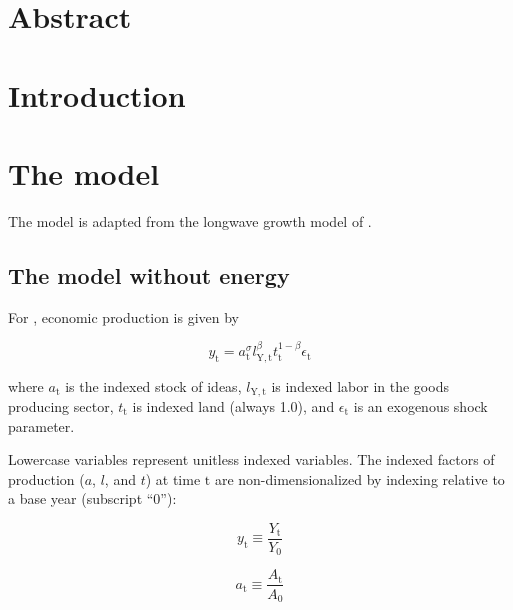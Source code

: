 \documentclass[letterpaper,12pt]{article}
\begin{document}

\section*{Abstract}

\section{Introduction}

\section{The model}

The model is adapted from the longwave growth model of \citet{Jones:2001wn}.

\subsection{The model without energy}

For \citet{Jones:2001wn}, economic production is given by

\begin{equation} \label{eq:Jones_production_function}
	y_\mathrm{t} = a_\mathrm{t} ^\sigma l_\mathrm{Y,t} ^\beta t_\mathrm{t} ^{1-\beta} \epsilon_\mathrm{t}
\end{equation}

\noindent where $a_\mathrm{t}$ is the indexed stock of ideas, $l_\mathrm{Y,t}$ is indexed labor in the goods producing sector, $t_\mathrm{t}$ is indexed land (always 1.0), and $\epsilon_\mathrm{t}$ is an exogenous shock parameter. 

Lowercase variables represent unitless indexed variables. The indexed factors of production ($a$, $l$, and $t$) at time $\mathrm{t}$ are non-dimensionalized by indexing relative to a base year (subscript ``0''):

\begin{equation} \label{eq:index_y}
	y_\mathrm{t} \equiv \frac{Y_\mathrm{t}}{Y_\mathrm{0}}
\end{equation}

\begin{equation} \label{eq:index_a}
	a_\mathrm{t} \equiv \frac{A_\mathrm{t}}{A_\mathrm{0}}
\end{equation}
\end{document}
